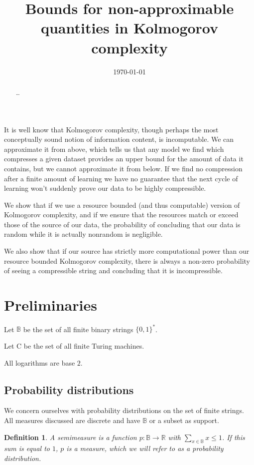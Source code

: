 \documentclass[10pt,a4paper,oneside]{article}
\title{Bounds for non-approximable quantities in Kolmogorov complexity}
\date{\today}
\newtheorem{dfn}{Definition}
\begin{document}
\maketitle

\begin{abstract}
\ldots
\end{abstract}

It is well know that Kolmogorov complexity, though perhaps the most conceptually sound notion of information content, is incomputable. We can approximate it from above, which tells us that any model we find which compresses a given dataset provides an upper bound for the amount of data it contains, but we cannot approximate it from below. If we find no compression after a finite amount of learning we have no guarantee that the next cycle of learning won't suddenly prove our data to be highly compressible. 

We show that if we use a resource bounded (and thus computable) version of Kolmogorov complexity, and if we ensure that the resources match or exceed those of the source of our data, the probability of concluding that our data is random while it is actually nonrandom is negligible.

We also show that if our source has strictly more computational power than our resource bounded Kolmogorov complexity, there is always a non-zero probability of seeing a compressible string and concluding that it is incompressible. 

\section*{Preliminaries}
Let $\mathbb B$ be the set of all finite binary strings $\{0,1\}^*$.

Let {\cal C} be the set of all finite Turing machines.

All logarithms are base $2$.

\subsection*{Probability distributions}

We concern ourselves with probability distributions on the set of finite strings. All measures discussed are discrete and have $\mathbb B$ or a subset as support.

\begin{dfn}
A \emph{semimeasure} is a function $p : {\mathbb B} \rightarrow {\mathbb R}$ with $\sum_{x \in \mathbb B} x \leq 1$. If this sum is equal to $1$, $p$ is a \emph{measure}, which we will refer to as a probability distribution.
\end{dfn}
\end{document}
